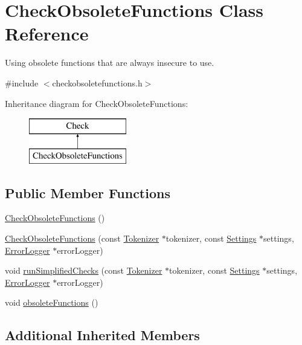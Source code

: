 \hypertarget{class_check_obsolete_functions}{\section{Check\-Obsolete\-Functions Class Reference}
\label{class_check_obsolete_functions}
}


Using obsolete functions that are always insecure to use.  




{\ttfamily \#include $<$checkobsoletefunctions.\-h$>$}

Inheritance diagram for Check\-Obsolete\-Functions\-:\begin{figure}[H]
\begin{center}
\leavevmode
\includegraphics[height=2.000000cm]{class_check_obsolete_functions}
\end{center}
\end{figure}
\subsection*{Public Member Functions}
\begin{DoxyCompactItemize}
\item 
\hyperlink{class_check_obsolete_functions_a4d3464d4fc4993aa1782d9c8e353bec5}{Check\-Obsolete\-Functions} ()
\item 
\hyperlink{class_check_obsolete_functions_a52803e4461320a2f59c2bb9003f104c1}{Check\-Obsolete\-Functions} (const \hyperlink{class_tokenizer}{Tokenizer} $\ast$tokenizer, const \hyperlink{class_settings}{Settings} $\ast$settings, \hyperlink{class_error_logger}{Error\-Logger} $\ast$error\-Logger)
\item 
void \hyperlink{class_check_obsolete_functions_ac79cfbdd5bf7e0b95941f2df07150ad0}{run\-Simplified\-Checks} (const \hyperlink{class_tokenizer}{Tokenizer} $\ast$tokenizer, const \hyperlink{class_settings}{Settings} $\ast$settings, \hyperlink{class_error_logger}{Error\-Logger} $\ast$error\-Logger)
\item 
void \hyperlink{class_check_obsolete_functions_adb06f8d244c4c75af643558d62c4a99c}{obsolete\-Functions} ()
\end{DoxyCompactItemize}
\subsection*{Additional Inherited Members}


